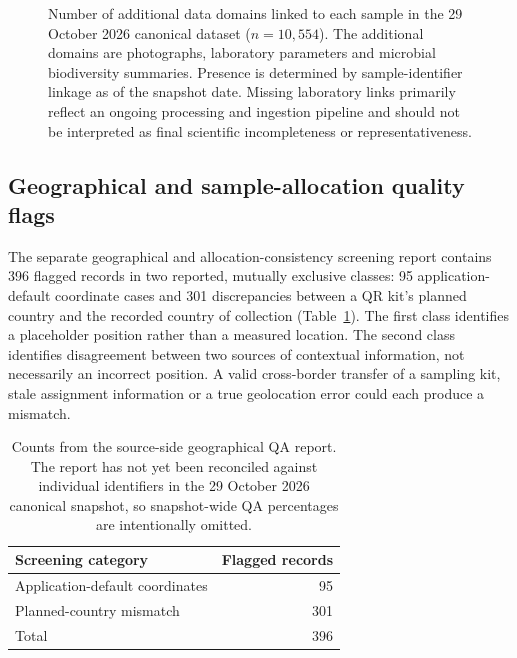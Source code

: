 \documentclass[11pt,a4paper]{article}
\begin{document}
\begin{figure}[htbp]
\centering
{}
\caption{Number of additional data domains linked to each sample in the 29 October 2026 canonical dataset ($n=10{,}554$). The additional domains are photographs, laboratory parameters and microbial biodiversity summaries. Presence is determined by sample-identifier linkage as of the snapshot date. Missing laboratory links primarily reflect an ongoing processing and ingestion pipeline and should not be interpreted as final scientific incompleteness or representativeness.}
\label{fig:domain-coverage}
\end{figure}

\subsection{Geographical and sample-allocation quality flags}
The separate geographical and allocation-consistency screening report contains 396 flagged records in two reported, mutually exclusive classes: 95 application-default coordinate cases and 301 discrepancies between a QR kit's planned country and the recorded country of collection (Table~\ref{tab:qa}). The first class identifies a placeholder position rather than a measured location. The second class identifies disagreement between two sources of contextual information, not necessarily an incorrect position. A valid cross-border transfer of a sampling kit, stale assignment information or a true geolocation error could each produce a mismatch.

\begin{table}[htbp]
\centering\small
\caption{Counts from the source-side geographical QA report. The report has not yet been reconciled against individual identifiers in the 29 October 2026 canonical snapshot, so snapshot-wide QA percentages are intentionally omitted.}
\label{tab:qa}
\begin{tabularx}{\linewidth}{@{}Xr@{}}
\toprule
Screening category & Flagged records \\
\midrule
Application-default coordinates & 95 \\
Planned-country mismatch & 301 \\
\midrule
Total & 396 \\
\bottomrule
\end{tabularx}
\end{table}
\end{document}
